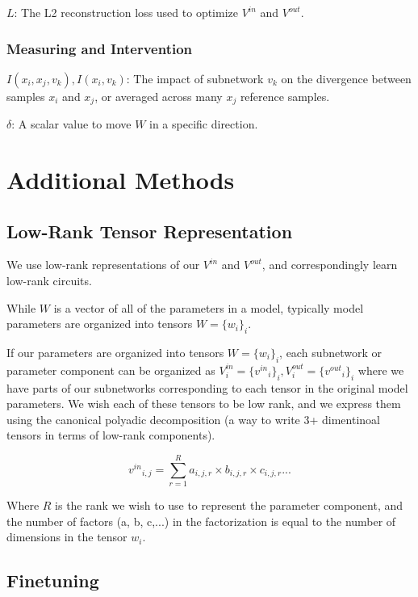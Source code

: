 \documentclass{article}
\theoremstyle{plain}
\theoremstyle{definition}
\theoremstyle{remark}
\begin{document}
$L$: The L2 reconstruction loss used to optimize $V^{in}$ and $V^{out}$.

\subsubsection{Measuring and Intervention}
$I(x_i, x_j, v_k), I(x_i, v_k)$: The impact of subnetwork $v_k$ on the divergence between samples $x_i$ and $x_j$, or averaged across many $x_j$ reference samples.

$\delta$: A scalar value to move $W$ in a specific direction. 


\section{Additional Methods}

\subsection{Low-Rank Tensor Representation}\label{sec:low_rank}

We use low-rank representations of our $V^{in}$ and $V^{out}$, and correspondingly learn low-rank circuits.

While $W$ is a vector of all of the parameters in a model, typically model parameters are organized into tensors $W=\{w_i\}_i$. 

If our parameters are organized into tensors $W=\{w_i\}_i$, each subnetwork or parameter component can be organized as $V^{in}_i  = {\{{v^{in}}_i\}}_i, V^{out}_i = {\{{v^{out}}_i\}}_i$ where we have parts of our subnetworks corresponding to each tensor in the original model parameters. We wish each of these tensors to be low rank, and we express them using the canonical polyadic decomposition \cite{} (a way to write 3+ dimentinoal tensors in terms of low-rank components).

\begin{equation}
{v^{in}}_{i,j} = \sum_{r=1}^{R} a_{i,j,r} \times b_{i,j,r} \times c_{i,j,r} ...
\end{equation}

Where $R$ is the rank we wish to use to represent the parameter component, and the number of factors (a, b, c,...) in the factorization is equal to the number of dimensions in the tensor $w_i$.

\subsection{Finetuning}\label{sec:finetuning}
\end{document}

